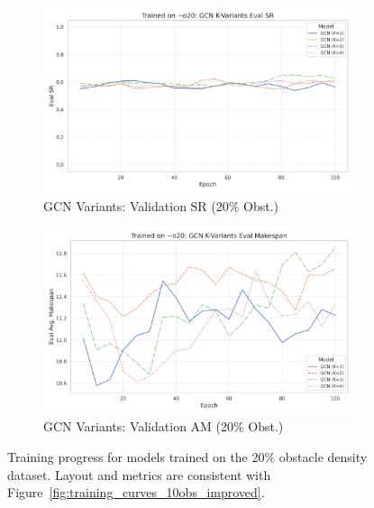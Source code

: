 \begin{figure}[htbp]
    \begin{subfigure}[b]{0.48\textwidth}
        \centering
        \includegraphics[width=\textwidth]{trainplotbase/TRAINED_ON_20_OBS/training_curves_focused/condition_o20/gcn_variants_eval_sr.png} %
        \caption{GCN Variants: Validation SR (20\% Obst.)}
        \label{fig:gcn_val_sr_20obs}
    \end{subfigure}
    \hfill
    \begin{subfigure}[b]{0.48\textwidth}
        \centering
        \includegraphics[width=\textwidth]{trainplotbase/TRAINED_ON_20_OBS/training_curves_focused/condition_o20/gcn_variants_eval_am.png} %
        \caption{GCN Variants: Validation AM (20\% Obst.)}
        \label{fig:gcn_val_am_20obs}
    \end{subfigure}

    \caption{Training progress for models trained on the 20\% obstacle density dataset. Layout and metrics are consistent with Figure~\ref{fig:training_curves_10obs_improved}.}
    \label{fig:training_curves_20obs_improved}
\end{figure}


